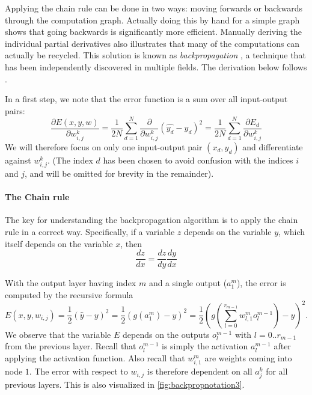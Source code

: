 Applying the chain rule can be done in two ways: moving forwards or backwards through the computation graph. Actually doing this by hand for a simple graph shows that going backwards is significantly more efficient. Manually deriving the individual partial derivatives also illustrates that many of the computations can actually be recycled. This solution is known as \textsl{backpropagation} \cite{rumelhart1985learning}, a technique that has been independently discovered in multiple fields. The derivation below follows \cite{backpropagation}.

In a first step, we note that the error function is a sum over all input-output pairs:
\begin{equation}
\frac{\partial E(x,y,w)}{\partial w_{i,j}^k}=\frac{1}{2N}\sum^N_{d=1}\frac{\partial}{\partial w_{i,j}^k}(\hat{y_d}-y_d)^2=\frac{1}{2N}\sum_{d=1}^N\frac{\partial E_d}{\partial w_{i,j}^k}
\end{equation}
We will therefore focus on only one input-output pair $(x_d,y_d)$ and differentiate against $w_{i,j}^k$. (The index $d$ has been chosen to avoid confusion with the indices $i$ and $j$, and will be omitted for brevity in the remainder).

\paragraph{The Chain rule} The key for understanding the backpropagation algorithm is to apply the chain rule in a correct way. Specifically, if a variable $z$ depends on the variable $y$, which itself depends on the variable $x$, then
\begin{equation}
\frac{dz}{dx}=\frac{dz}{dy}\frac{dy}{dx}
\end{equation}

With the output layer having index $m$ and a single output ($a^m_1$), the error is computed by the recursive formula
\begin{equation}
E(x,y,w_{i,j})=\frac{1}{2}(\hat{y}-y)^2=\frac{1}{2}(g(a_1^m)-y)^2=
\frac{1}{2}\left(g\left(\sum_{l=0}^{r_{m-1}}w_{l,1}^mo_l^{m-1}\right)-y\right)^2.
\end{equation}
We observe that the variable $E$ depends on the outputs $o_l^{m-1}$ with $l=0..r_{m-1}$ from the previous layer. Recall that $o_l^{m-1}$ is simply the activation $a_l^{m-1}$ after applying the activation function. Also recall that $w^m_{i,1}$ are weights coming into node $1$. The error with respect to $w_{i,j}$ is therefore dependent on all $a^k_j$ for all previous layers. This is also visualized in \cref{fig:backpropnotation3}.

